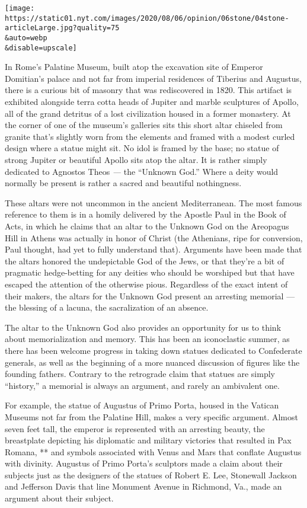 \texttt{[image: https://static01.nyt.com/images/2020/08/06/opinion/06stone/04stone-articleLarge.jpg?quality=75\\\&auto=webp\\\&disable=upscale]}

In Rome's Palatine Museum, built atop the excavation site of Emperor
Domitian's palace and not far from imperial residences of Tiberius and
Augustus, there is a curious bit of masonry that was rediscovered in
1820. This artifact is exhibited alongside terra cotta heads of Jupiter
and marble sculptures of Apollo, all of the grand detritus of a lost
civilization housed in a former monastery. At the corner of one of the
museum's galleries sits this short altar chiseled from granite that's
slightly worn from the elements and framed with a modest curled design
where a statue might sit. No idol is framed by the base; no statue of
strong Jupiter or beautiful Apollo sits atop the altar. It is rather
simply dedicated to Agnostos Theos \emph{---} the ``Unknown God.'' Where
a deity would normally be present is rather a sacred and beautiful
nothingness.

These altars were not uncommon in the ancient Mediterranean. The most
famous reference to them is in a homily delivered by the Apostle Paul in
the Book of Acts, in which he claims that an altar to the Unknown God on
the Areopagus Hill in Athens was actually in honor of Christ (the
Athenians, ripe for conversion, Paul thought, had yet to fully
understand that). Arguments have been made that the altars honored the
undepictable God of the Jews, or that they're a bit of pragmatic
hedge-betting for any deities who should be worshiped but that have
escaped the attention of the otherwise pious. Regardless of the exact
intent of their makers, the altars for the Unknown God present an
arresting memorial --- the blessing of a lacuna, the sacralization of an
absence.

The altar to the Unknown God also provides an opportunity for us to
think about memorialization and memory. This has been an iconoclastic
summer, as there has been welcome progress in taking down statues
dedicated to Confederate generals, as well as the beginning of a more
nuanced discussion of figures like the founding fathers. Contrary to the
retrograde claim that statues are simply ``history,'' a memorial is
always an argument, and rarely an ambivalent one.

For example, the statue of Augustus of Primo Porta, housed in the
Vatican Museums not far from the Palatine Hill, makes a very specific
argument. Almost seven feet tall, the emperor is represented with an
arresting beauty, the breastplate depicting his diplomatic and military
victories that resulted in Pax Romana, ** and symbols associated with
Venus and Mars that conflate Augustus with divinity. Augustus of Primo
Porta's sculptors made a claim about their subjects just as the
designers of the statues of Robert E. Lee, Stonewall Jackson and
Jefferson Davis that line Monument Avenue in Richmond, Va., made an
argument about their subject.

